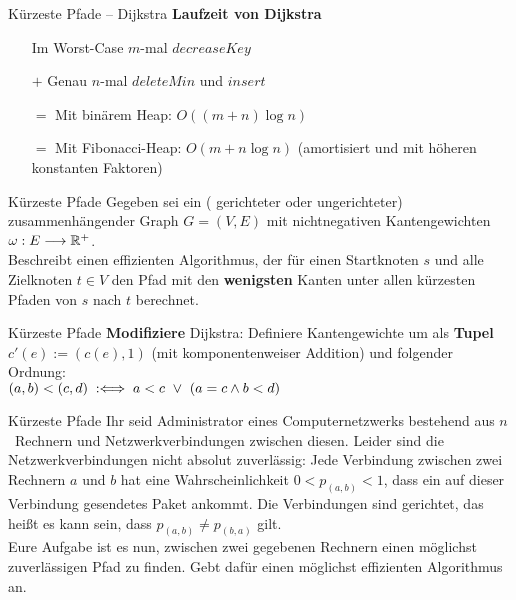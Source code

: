 \begin{frame}{Kürzeste Pfade – Dijkstra}
	\textbf{Laufzeit von Dijkstra} 
	\begin{itemize}
		\item[] Im Worst-Case $m$-mal $decreaseKey$
		\item[$+$] Genau $n$-mal $deleteMin$ und $insert$
		\pause
		\item[$=$] Mit binärem Heap: $O\left((m+n)\log n\right)$
		\pause
		\item[$=$] Mit Fibonacci-Heap: $O(m + n \log n)$ \quad (amortisiert und mit höheren konstanten Faktoren)
	\end{itemize}
\end{frame}

\begin{frame}{Kürzeste Pfade}
	Gegeben sei ein ( gerichteter oder ungerichteter) zusammenhängender Graph $G = (V, E)$ mit nichtnegativen Kantengewichten $\omega : E \longrightarrow \mathbb{R}^{+}$. \\
	\smallskip
	 Beschreibt einen effizienten Algorithmus, der für einen Startknoten $s$ und alle Zielknoten $t \in V$ den Pfad mit den \textbf{wenigsten} Kanten unter allen kürzesten Pfaden von $s$ nach $t$ berechnet.
\end{frame}

\begin{frame}{Kürzeste Pfade}
	\solutionheading
	\textbf{Modifiziere} Dijkstra: Definiere Kantengewichte um als \textbf{Tupel} $c'(e) := \left(c(e), 1\right)$ (mit komponentenweiser Addition) und folgender Ordnung: \\ $(a, b) < (c, d) \Gdwdef a < c \ \lor\  (a = c \land b < d)$ 
\end{frame}

\begin{frame}{Kürzeste Pfade}
	Ihr seid Administrator eines Computernetzwerks bestehend aus $n$~Rechnern und Netzwerkverbindungen
	zwischen diesen. Leider sind die Netzwerkverbindungen nicht absolut zuverlässig: Jede Verbindung
	zwischen zwei Rechnern $a$ und $b$ hat eine Wahrscheinlichkeit $0 < p_{(a,b)} < 1$, dass ein auf dieser
	Verbindung gesendetes Paket ankommt. Die Verbindungen sind gerichtet, das heißt es kann sein,
	dass $p_{(a,b)} \neq p_{(b,a)}$ gilt. \\
	\medskip
	Eure Aufgabe ist es nun, zwischen zwei gegebenen Rechnern einen möglichst zuverlässigen Pfad zu finden.
	Gebt dafür einen möglichst effizienten Algorithmus an.
\end{frame}

